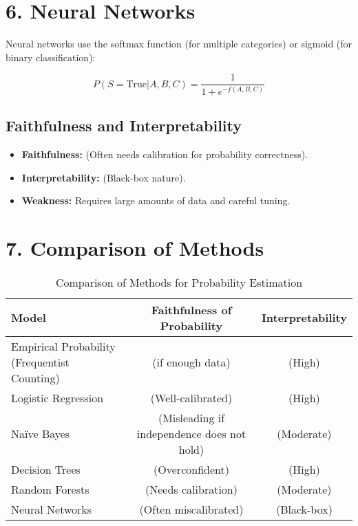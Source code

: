 \documentclass{article}
\begin{document}
\section{6. Neural Networks}
Neural networks use the softmax function (for multiple categories) or sigmoid (for binary classification):

\[
P(S = \text{True} | A, B, C) = \frac{1}{1 + e^{-f(A, B, C)}}
\]

\subsection{Faithfulness and Interpretability}
\begin{itemize}
    \item \textbf{Faithfulness:}  (Often needs calibration for probability correctness).
    \item \textbf{Interpretability:}  (Black-box nature).
    \item \textbf{Weakness:} Requires large amounts of data and careful tuning.
\end{itemize}

\section{7. Comparison of Methods}
\begin{table}[h]
    \centering
    \begin{tabular}{l|c|c}
        \toprule
        \textbf{Model} & \textbf{Faithfulness of Probability} & \textbf{Interpretability} \\
        \midrule
        Empirical Probability (Frequentist Counting) & (if enough data) & (High) \\
        Logistic Regression & (Well-calibrated) & (High) \\
        Naïve Bayes & (Misleading if independence does not hold) & (Moderate) \\
        Decision Trees & (Overconfident) & (High) \\
        Random Forests & (Needs calibration) & (Moderate) \\
        Neural Networks & (Often miscalibrated) & (Black-box) \\
        \bottomrule
    \end{tabular}
    \caption{Comparison of Methods for Probability Estimation}
\end{table}
\end{document}
